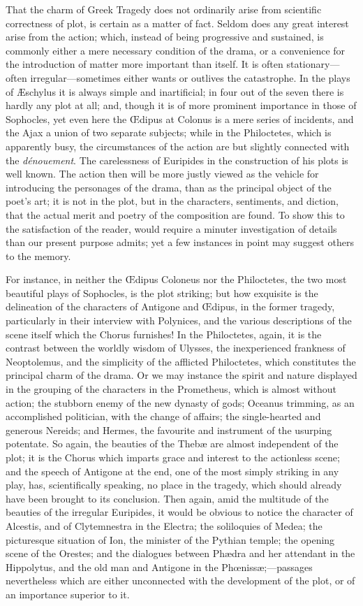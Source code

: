 That the charm of Greek Tragedy does not ordinarily arise from
scientific correctness of plot, is certain as a matter of fact. Seldom
does any great interest arise from the action; which, instead of being
progressive and sustained, is commonly either a mere necessary
condition of the drama, or a convenience for the introduction of
matter more important than itself. It is often stationary—often
irregular—sometimes either wants or outlives the catastrophe. In the
plays of Æschylus it is always simple and inartificial; in four out
of the seven there is hardly any plot at all; and, though it is of
more prominent importance in those of Sophocles, yet even here the
Œdipus at Colonus is a mere series of incidents, and the Ajax a union
of two separate subjects; while in the Philoctetes, which is
apparently busy, the circumstances of the action are but slightly
connected with the \emph{dénouement}. The carelessness of Euripides
in the construction of his plots is well known. The action then will
be more justly viewed as the vehicle for introducing the personages of
the drama, than as the principal object of the poet's art; it is not
in the plot, but in the characters, sentiments, and diction, that the
actual merit and poetry of the composition are found. To show this to
the satisfaction of the reader, would require a minuter investigation
of details than our present purpose admits; yet a few instances in
point may suggest others to the memory.

For instance, in neither the Œdipus Coloneus nor the Philoctetes, the two most beautiful plays of Sophocles, is the plot
striking; but how exquisite is the delineation of the characters of
Antigone and Œdipus, in the former tragedy, particularly in their
interview with Polynices, and the various descriptions of the scene
itself which the Chorus furnishes! In the Philoctetes, again, it is
the contrast between the worldly wisdom of Ulysses, the inexperienced
frankness of Neoptolemus, and the simplicity of the afflicted
Philoctetes, which constitutes the principal charm of the drama. Or we
may instance the spirit and nature displayed in the grouping of the
characters in the Prometheus, which is almost without action; the
stubborn enemy of the new dynasty of gods; Oceanus trimming, as an
accomplished politician, with the change of affairs; the
single-hearted and generous Nereids; and Hermes, the favourite and
instrument of the usurping potentate. So again, the beauties of the
Thebæ are almost independent of the plot; it is the Chorus which
imparts grace and interest to the actionless scene; and the speech of
Antigone at the end, one of the most simply striking in any play, has,
scientifically speaking, no place in the tragedy, which should already
have been brought to its conclusion. Then again, amid the multitude of
the beauties of the irregular Euripides, it would be obvious to notice
the character of Alcestis, and of Clytemnestra in the Electra; the
soliloquies of Medea; the picturesque situation of Ion, the minister
of the Pythian temple; the opening scene of the Orestes; and the
dialogues between Phædra and her attendant in the Hippolytus, and the
old man and Antigone in the Phœnissæ;—passages nevertheless which
are either unconnected with the development of the plot, or of an
importance superior to it.

